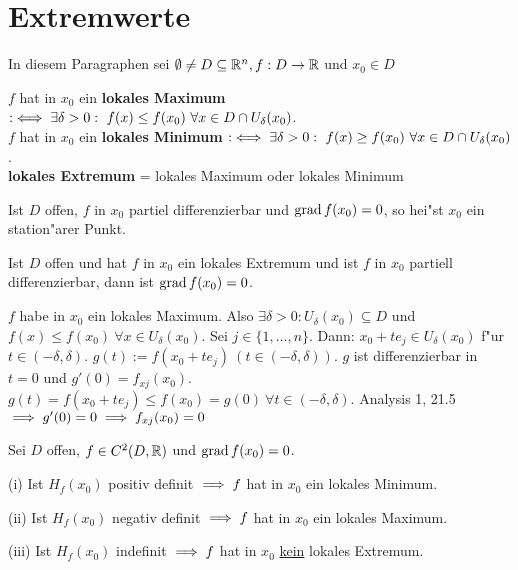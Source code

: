 \documentclass[a4paper,twoside,DIV15,BCOR12mm,chapterprefix=true,headings=twolinechapter]{scrbook}
\begin{document}
\chapter{Extremwerte}
\def\grad{\mathop{\rm grad}\nolimits}

\begin{vereinbarung}
In diesem Paragraphen sei $\emptyset\ne D \subseteq\mathbb{R}^n, f:D\to\mathbb{R}$ und $x_0\in D$
\end{vereinbarung}

\begin{definition*}
\begin{liste}
\item
$f$ hat in $x_0$ ein \textbf{lokales Maximum} $:\iff \exists \delta>0:\ f(x)\le f(x_0)\ \forall x\in D \cap U_\delta(x_0)$.\\
$f$ hat in $x_0$ ein \textbf{lokales Minimum} $:\iff \exists \delta>0:\ f(x)\ge f(x_0)\ \forall x\in D \cap U_\delta(x_0)$.\\
\textbf{lokales Extremum} = lokales Maximum oder lokales Minimum
\item Ist $D$ offen, $f$ in $x_0$ partiel differenzierbar und $\grad f(x_0)=0$, so hei"st $x_0$ ein station"arer Punkt.
\end{liste}
\end{definition*}

\begin{satz}
Ist $D$ offen und hat $f$ in $x_0$ ein lokales Extremum und ist $f$ in $x_0$ partiell differenzierbar, dann ist $\grad f(x_0)=0$.
\end{satz}

\begin{beweis}
$f$ habe in $x_0$ ein lokales Maximum. Also $\exists \delta>0: U_\delta(x_0)\subseteq D$ und $f(x)\le f(x_0)\ \forall x\in U_\delta(x_0)$. Sei $j \in \{1,\ldots,n\}$. Dann: $x_0 + te_j \in U_\delta(x_0)$ f"ur $t\in (-\delta, \delta)$. $g(t):=f(x_0 + te_j)\ (t\in (-\delta, \delta))$. $g$ ist differenzierbar in $t=0$ und $g'(0)=f_{xj}(x_0)$. $g(t)=f(x_0+te_j)\le f(x_0)=g(0)\ \forall t\in(-\delta,\delta)$. Analysis 1, 21.5 $\implies g'(0)=0\implies f_{xj}(x_0)=0$
\end{beweis}

\begin{satz}
Sei $D$ offen, $f\in C^2(D,\mathbb{R})$ und $\grad f(x_0)=0$.
\begin{liste}
\item[(i)]
Ist $H_f(x_0)$ positiv definit $\implies f$ hat in $x_0$ ein lokales Minimum.
\item[(ii)]
Ist $H_f(x_0)$ negativ definit $\implies f$ hat in $x_0$ ein lokales Maximum.
\item[(iii)]
Ist $H_f(x_0)$ indefinit $\implies f$ hat in $x_0$ \underline{kein} lokales Extremum.
\end{liste}
\end{satz}
\end{document}
